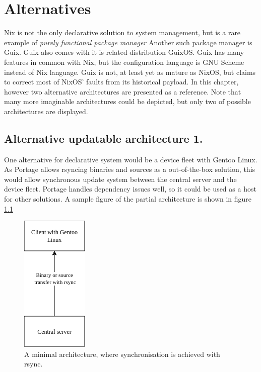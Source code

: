 \chapter{Alternatives} \label{alternatives}
Nix is not the only declarative solution to system management, but is a
rare example of \textit{purely functional package manager} Another
such package manager is Guix. Guix also comes with it is related
distribution GuixOS. Guix has many features in common with Nix, but
the configuration language is GNU Scheme instead of Nix language. Guix
is not, at least yet as mature as NixOS, but claims to correct most of
NixOS' faults from its historical payload. In this chapter, however
two alternative architectures are presented as a reference. Note that
many more imaginable architectures could be depicted, but only two of
possible architectures are displayed. \cite{dolstra2010nixos}
\cite{courtes2013functional}

\section{Alternative updatable architecture 1.}
One alternative for declarative system would be a device fleet with
Gentoo Linux. As Portage allows rsyncing binaries and sources as a
out-of-the-box solution, this would allow synchronous update system
between the central server and the device fleet. Portage handles
dependency issues well, so it could be used as a host for other
solutions. A sample figure of the partial architecture is shown in
figure \ref{gentooarchitecture} \cite{thiruvathukal2004gentoo}
\begin{figure}[H]
\centering
\includegraphics[scale=0.8]{latex/kuvat/gentooarchitecture.drawio.png}
\caption{A minimal architecture, where synchronisation is achieved
  with rsync.}
\label{gentooarchitecture}
\end{figure}

